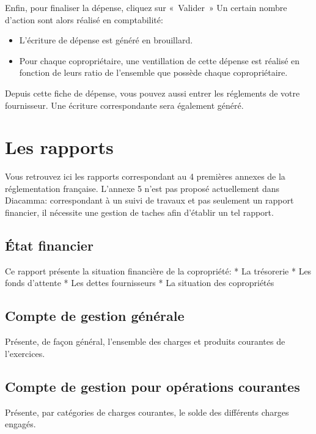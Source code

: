 \documentclass[a4paper,10pt,oneside,french]{sphinxmanual}
\begin{document}
Enfin, pour finaliser la dépense, cliquez sur « Valider »
Un certain nombre d’action sont alors réalisé en comptabilité:
\begin{itemize}
\item {} 
L’écriture de dépense est généré en brouillard.

\item {} 
Pour chaque copropriétaire, une ventillation de cette dépense est réalisé en fonction de leurs ratio de l’ensemble que possède chaque copropriétaire.

\end{itemize}

Depuis cette fiche de dépense, vous pouvez aussi entrer les réglements de votre fournisseur.
Une écriture correspondante sera également généré.


\section{Les rapports}
\label{\detokenize{condominium/report:les-rapports}}\label{\detokenize{condominium/report::doc}}
Vous retrouvez ici les rapports correspondant au 4 premières annexes de la réglementation française.
L’annexe 5 n’est pas proposé actuellement dans Diacamma: correspondant à un suivi de travaux et pas seulement un rapport financier, il nécessite une gestion de taches afin d’établir un tel rapport.


\subsection{État financier}
\label{\detokenize{condominium/report:etat-financier}}
Ce rapport présente la situation financière de la copropriété:
* La trésorerie
* Les fonds d’attente
* Les dettes fournisseurs
* La situation des copropriétés


\subsection{Compte de gestion générale}
\label{\detokenize{condominium/report:compte-de-gestion-generale}}
Présente, de façon général, l’ensemble des charges et produits courantes de l’exercices.


\subsection{Compte de gestion pour opérations courantes}
\label{\detokenize{condominium/report:compte-de-gestion-pour-operations-courantes}}
Présente, par catégories de charges courantes, le solde des différents charges engagés.
\end{document}
